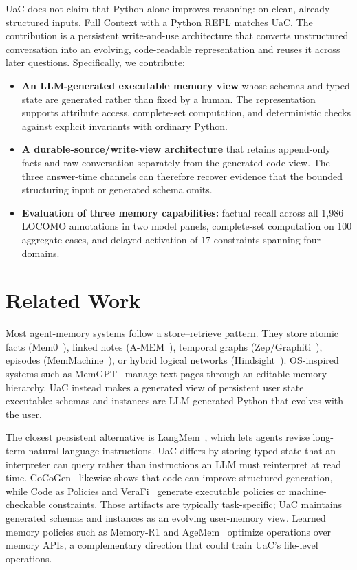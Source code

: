 \documentclass[letterpaper]{article} %
\begin{document}
UaC does not claim that Python alone improves reasoning: on clean, already structured inputs, Full Context with a Python REPL matches UaC. The contribution is a persistent write-and-use architecture that converts unstructured conversation into an evolving, code-readable representation and reuses it across later questions. Specifically, we contribute:
\begin{itemize}
\item \textbf{An LLM-generated executable memory view} whose schemas and typed state are generated rather than fixed by a human. The representation supports attribute access, complete-set computation, and deterministic checks against explicit invariants with ordinary Python.
\item \textbf{A durable-source/write-view architecture} that retains append-only facts and raw conversation separately from the generated code view. The three answer-time channels can therefore recover evidence that the bounded structuring input or generated schema omits.
\item \textbf{Evaluation of three memory capabilities:} factual recall across all 1{,}986 LOCOMO annotations in two model panels, complete-set computation on 100 aggregate cases, and delayed activation of 17 constraints spanning four domains.
\end{itemize}

\section{Related Work}
\label{sec:related}

Most agent-memory systems follow a store--retrieve pattern. They store atomic facts (Mem0~\citep{chhikara2025mem0}), linked notes (A-MEM~\citep{xu2025amem}), temporal graphs (Zep/Graphiti~\citep{rasmussen2025zep}), episodes (MemMachine~\citep{wang2026memmachine}), or hybrid logical networks (Hindsight~\citep{latimer2025hindsight}). OS-inspired systems such as MemGPT~\citep{packer2023memgpt} manage text pages through an editable memory hierarchy. UaC instead makes a generated view of persistent user state executable: schemas and instances are LLM-generated Python that evolves with the user.

The closest persistent alternative is LangMem~\citep{langmem2025}, which lets agents revise long-term natural-language instructions. UaC differs by storing typed state that an interpreter can query rather than instructions an LLM must reinterpret at read time. CoCoGen~\citep{madaan2022cocogen} likewise shows that code can improve structured generation, while Code as Policies and VeraFi~\citep{liang2023codeaspolicies,akinfaderin2025verafi} generate executable policies or machine-checkable constraints. Those artifacts are typically task-specific; UaC maintains generated schemas and instances as an evolving user-memory view. Learned memory policies such as Memory-R1 and AgeMem~\citep{yan2025memoryr1,yu2026agemem} optimize operations over memory APIs, a complementary direction that could train UaC's file-level operations.
\end{document}
